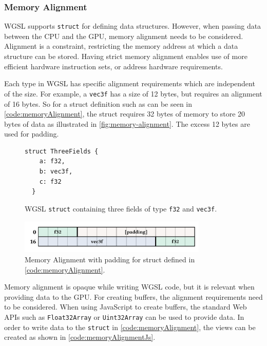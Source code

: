 \subsubsection{Memory Alignment}
\label{ch:memoryAlignmentTheory}

\gls{WGSL} supports \texttt{struct} for defining data structures. However, when passing data between the \gls{CPU} and the \gls{GPU}, memory alignment needs to be considered. Alignment is a constraint, restricting the memory address at which a data structure can be stored. Having strict memory alignment enables use of more efficient hardware instruction sets, or address hardware requirements.

Each type in \gls{WGSL} has specific alignment requirements which are independent of the size. For example, a \texttt{vec3f} has a size of 12 bytes, but requires an alignment of 16 bytes. So for a struct definition such as can be seen in \autoref{code:memoryAlignment}, the struct requires 32 bytes of memory to store 20 bytes of data as illustrated in \autoref{fig:memory-alignment}. The excess 12 bytes are used for padding.

\begin{figure}[H]
  \begin{lstlisting}[style=wgsl]
  struct ThreeFields {
    a: f32,
    b: vec3f,
    c: f32
  }
  \end{lstlisting}
  \caption{\gls{WGSL} \texttt{struct} containing three fields of type \texttt{f32} and \texttt{vec3f}.}
  \label{code:memoryAlignment}
  \end{figure}

\begin{figure}[H]
  \centering
  \includegraphics[width=0.8\textwidth]{resources/memory-alignment.png}
  \caption{Memory Alignment with padding for struct defined in \autoref{code:memoryAlignment}.}
  \label{fig:memory-alignment}
\end{figure}

Memory alignment is opaque while writing \gls{WGSL} code, but it is relevant when providing data to the \gls{GPU}. For creating buffers, the alignment requirements need to be considered. When using JavaScript to create buffers, the standard Web \glspl{API} such as \texttt{Float32Array} or \texttt{Uint32Array} can be used to provide data. In order to write data to the \texttt{struct} in \autoref{code:memoryAlignment}, the views can be created as shown in \autoref{code:memoryAlignmentJs}.

